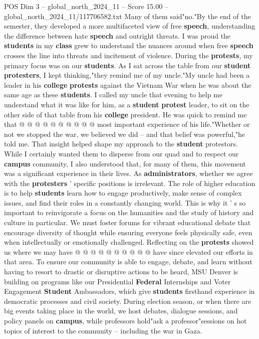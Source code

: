 \begin{textsample}{POS Dim 3 – global\_north\_2024\_11 – Score 15.00 – global\_north\_2024\_11/117706582.txt}
Many of them said"no."By the end of the semester, they developed a more multifaceted view of free \textbf{speech}, understanding the difference between hate \textbf{speech} and outright threats.
I was proud the \textbf{students} in my \textbf{class} grew to understand the nuances around when free \textbf{speech} crosses the line into threats and incitement of violence.
During the \textbf{protests}, my primary focus was on our \textbf{students}.
As I sat across the table from our \textbf{student} \textbf{protesters}, I kept thinking,"they remind me of my uncle."My uncle had been a leader in his \textbf{college} \textbf{protests} against the Vietnam War when he was about the same age as these \textbf{students}.
I called my uncle that evening to help me understand what it was like for him, as a \textbf{student} \textbf{protest} leader, to sit on the other side of that table from his \textbf{college} president.
He was quick to remind me that @ @ @ @ @ @ @ @ @ @ most important experience of his life."Whether or not we stopped the war, we believed we did -- and that belief was powerful,"he told me.
That insight helped shape my approach to the \textbf{student} protestors.
While I certainly wanted them to disperse from our quad and to respect our \textbf{campus} community, I also understood that, for many of them, this movement was a significant experience in their lives.
As \textbf{administrators}, whether we agree with the \textbf{protesters} ' specific positions is irrelevant.
The role of higher education is to help \textbf{students} learn how to engage productively, make sense of complex issues, and find their roles in a constantly changing world.
This is why it ' s so important to reinvigorate a focus on the humanities and the study of history and culture in particular.
We must foster forums for vibrant educational debate that encourage diversity of thought while ensuring everyone feels physically safe, even when intellectually or emotionally challenged.
Reflecting on the \textbf{protests} showed us where we may have @ @ @ @ @ @ @ @ @ @ have since elevated our efforts in that area.
To ensure our community is able to engage, debate, and learn without having to resort to drastic or disruptive actions to be heard, MSU Denver is building on programs like our Presidential \textbf{Federal} Internships and Voter Engagement \textbf{Student} Ambassadors, which give \textbf{students} firsthand experience in democratic processes and civil society.
During election season, or when there are big events taking place in the world, we host debates, dialogue sessions, and policy panels on \textbf{campus}, while professors hold"ask a professor"sessions on hot topics of interest to the community -- including the war in Gaza.

\end{textsample}
